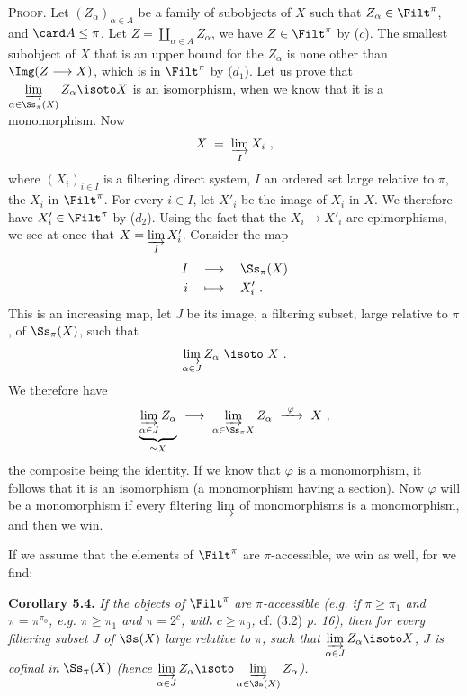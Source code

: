\textsc{Proof}. Let $(Z_{\alpha})_{\alpha\in A}$ be a family of subobjects of $X$ such that $Z_{\alpha} \in \Filt^{\pi}$, and $\card A \leq \pi$. Let $Z = \coprod_{\alpha\in A} Z_{\alpha}$, we have $Z \in \Filt^{\pi}$ by ($c$). The smallest subobject of $X$ that is an upper bound for the $Z_{\alpha}$ is none other than $\Img (Z \longrightarrow X)$, which is in $\Filt^{\pi}$ by ($d_1$). Let us prove that $\varinjlim\limits_{\alpha\in\Ss_{\pi}(X)} Z_{\alpha} \isoto X$ is an isomorphism, when we know that it is a monomorphism. Now
\[
X \;=\; \varinjlim_{I} X_i \ ,
\]
where $(X_i)_{i\in I}$ is a filtering direct system, $I$ an ordered set large relative to $\pi$, the $X_i$ in $\Filt^{\pi}$. For every $i \in I$, let $X'_i$ be the image of $X_i$ in $X$. We therefore have $X'_i \in \Filt^{\pi}$ by ($d_2$). Using the fact that the $X_i \longrightarrow X'_i$ are epimorphisms, we see at once that $X = \varinjlim\limits_{I} X'_i$. Consider the map
\[
\begin{aligned}
I \quad &\longrightarrow \quad \Ss_{\pi}(X)\\
i \quad &\longmapsto \quad X'_i \ .
\end{aligned}
\]
This is an increasing map, let $J$ be its image, a filtering subset, large relative to $\pi$, of $\Ss_{\pi}(X)$, such that
\[
\varinjlim_{\alpha\in J} Z_{\alpha} \ \isoto \ X \ .
\]
We therefore have
\[
\underbrace{\varinjlim_{\alpha\in J} Z_{\alpha}}_{\simeq X} \ \longrightarrow \ \varinjlim_{\alpha\in\Ss_{\pi}X} Z_{\alpha} \ \xrightarrow{\ \varphi\ } \ X \ ,
\]
the composite being the identity. If we know that $\varphi$ is a monomorphism, it follows that it is an isomorphism (a monomorphism having a section). Now $\varphi$ will be a monomorphism if every filtering $\varinjlim$ of monomorphisms is a monomorphism, and then we win.


If we assume that the elements of $\Filt^{\pi}$ are $\pi$-accessible, we win as well, for we find:

\textbf{Corollary 5.4.} \textit{If the objects of} $\Filt^{\pi}$ \textit{are $\pi$-accessible (e.g. if $\pi \geq \pi_1$ and $\pi = \pi^{\pi_0}$, e.g. $\pi \geq \pi_1$ and $\pi = 2^{c}$, with $c \geq \pi_0$,} cf. (3.2) \textit{p. 16), then for every filtering subset $J$ of} $\Ss(X)$ \textit{large relative to $\pi$, such that $\varinjlim\limits_{\alpha\in J} Z_{\alpha} \isoto X$, $J$ is cofinal in} $\Ss_{\pi}(X)$ \textit{(hence $\varinjlim\limits_{\alpha\in J} Z_{\alpha} \isoto \varinjlim\limits_{\alpha\in\Ss(X)} Z_{\alpha}$).}

